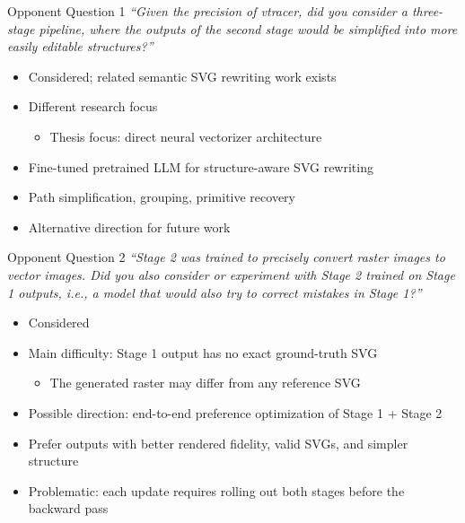 \documentclass[
  aspectratio=169,
]{beamer}
\newcommand{\tightitems}{\setlength{\itemsep}{0.35em}}
\begin{document}
\begin{frame}{Opponent Question 1}
\textit{``Given the precision of vtracer, did you consider a three-stage
pipeline, where the outputs of the second stage would be simplified into more
easily editable structures?''}

\vspace{.8em}
\begin{itemize}
  \tightitems
  \item Considered; related semantic SVG rewriting work exists~\cite{kim2026meol}
  \item Different research focus
    \begin{itemize}
      \tightitems
      \item Thesis focus: direct neural vectorizer architecture
    \end{itemize}
  \item Fine-tuned pretrained LLM for structure-aware SVG rewriting
  \item Path simplification, grouping, primitive recovery
  \item Alternative direction for future work
\end{itemize}
\end{frame}

\begin{frame}{Opponent Question 2}
\textit{``Stage 2 was trained to precisely convert raster images to vector
images. Did you also consider or experiment with Stage 2 trained on Stage 1
outputs, i.e., a model that would also try to correct mistakes in Stage 1?''}

\vspace{.8em}
\begin{itemize}
  \tightitems
  \item Considered
  \item Main difficulty: Stage 1 output has no exact ground-truth SVG
    \begin{itemize}
      \tightitems
  \item The generated raster may differ from any reference SVG
    \end{itemize}
  \item Possible direction: end-to-end preference optimization of Stage 1 + Stage 2
  \item Prefer outputs with better rendered fidelity, valid SVGs, and simpler structure
  \item Problematic: each update requires rolling out both stages before the backward pass
\end{itemize}
\end{frame}
\end{document}
